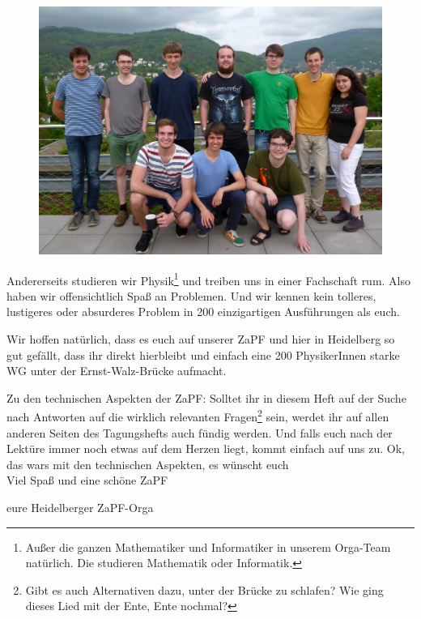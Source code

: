 \begin{figure}
\includegraphics[width=.65\textwidth]{media/orga}
\end{figure}

Andererseits studieren wir Physik\footnote{Außer die ganzen Mathematiker und Informatiker in unserem Orga-Team natürlich. Die studieren Mathematik oder Informatik.} und treiben uns in einer Fachschaft rum. Also haben wir offensichtlich Spaß an Problemen. Und wir kennen kein tolleres, lustigeres oder absurderes Problem in 200 einzigartigen Ausführungen als euch.

Wir hoffen natürlich, dass es euch auf unserer ZaPF und hier in Heidelberg so gut gefällt, dass ihr direkt hierbleibt und einfach eine 200 PhysikerInnen starke WG unter der Ernst-Walz-Brücke aufmacht.

Zu den technischen Aspekten der ZaPF: Solltet ihr in diesem Heft auf der Suche nach Antworten auf die wirklich relevanten Fragen\footnote{Gibt es auch Alternativen dazu, unter der Brücke zu schlafen? Wie ging dieses Lied mit der Ente, Ente nochmal?} sein, werdet ihr auf allen anderen Seiten des Tagungshefts auch fündig werden. Und falls euch nach der Lektüre immer noch etwas auf dem Herzen liegt, kommt einfach auf uns zu. Ok, das wars mit den technischen Aspekten, es wünscht euch\\

Viel Spaß und eine schöne ZaPF

eure Heidelberger ZaPF-Orga
